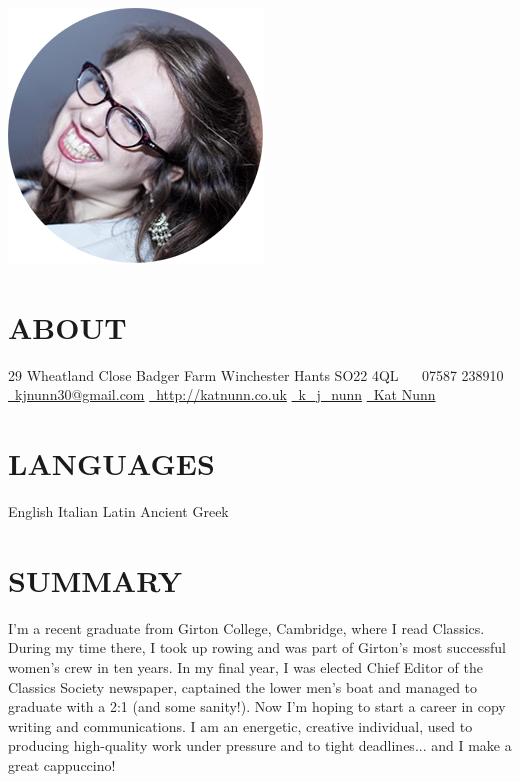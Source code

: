 \documentclass[]{friggeri-cv}
\begin{document}
       {}

\begin{aside}
  \includegraphics[width=.66\textwidth]{../img/profile.png}
  \section{ABOUT}
    29 Wheatland Close
    Badger Farm
    Winchester
    Hants
    SO22 4QL
    ~
    \faPhone~07587 238910
    \href{mailto:kjnunn30@gmail.com}{\faEnvelope~kjnunn30@gmail.com}
    \href{http://katnunn.co.uk}{\faGlobe~http://katnunn.co.uk}
    \href{https://twitter.com/k\_j\_nunn}{\faTwitter~k\_j\_nunn}
    \href{http://uk.linkedin.com/in/katnunn/}{\faLinkedin~Kat Nunn}
  \section{LANGUAGES}
    English
    Italian
    Latin
    Ancient Greek
\end{aside}

\section{SUMMARY}

I'm a recent graduate from Girton College, Cambridge, where I read Classics. During my time there, I took up rowing and was part of Girton's most successful women's crew in ten years. In my final year, I was elected Chief Editor of the Classics Society newspaper, captained the lower men's boat and managed to graduate with a 2:1 (and some sanity!). Now I'm hoping to start a career in copy writing and communications. I am an energetic, creative individual, used to producing high-quality work under pressure and to tight deadlines... and I make a great cappuccino!
\end{document}
